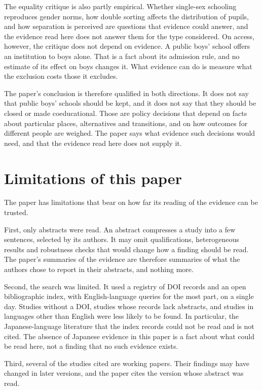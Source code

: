 \documentclass[11pt]{article}
\begin{document}
The equality critique is also partly empirical. Whether single-sex schooling reproduces gender norms, how double sorting affects the distribution of pupils, and how separation is perceived are questions that evidence could answer, and the evidence read here does not answer them for the type considered. On access, however, the critique does not depend on evidence. A public boys' school offers an institution to boys alone. That is a fact about its admission rule, and no estimate of its effect on boys changes it. What evidence can do is measure what the exclusion costs those it excludes.

The paper's conclusion is therefore qualified in both directions. It does not say that public boys' schools should be kept, and it does not say that they should be closed or made coeducational. Those are policy decisions that depend on facts about particular places, alternatives and transitions, and on how outcomes for different people are weighed. The paper says what evidence such decisions would need, and that the evidence read here does not supply it.

\section{Limitations of this paper}\label{sec:limits}

The paper has limitations that bear on how far its reading of the evidence can be trusted.

First, only abstracts were read. An abstract compresses a study into a few sentences, selected by its authors. It may omit qualifications, heterogeneous results and robustness checks that would change how a finding should be read. The paper's summaries of the evidence are therefore summaries of what the authors chose to report in their abstracts, and nothing more.

Second, the search was limited. It used a registry of DOI records and an open bibliographic index, with English-language queries for the most part, on a single day. Studies without a DOI, studies whose records lack abstracts, and studies in languages other than English were less likely to be found. In particular, the Japanese-language literature that the index records could not be read and is not cited. The absence of Japanese evidence in this paper is a fact about what could be read here, not a finding that no such evidence exists.

Third, several of the studies cited are working papers. Their findings may have changed in later versions, and the paper cites the version whose abstract was read.
\end{document}
